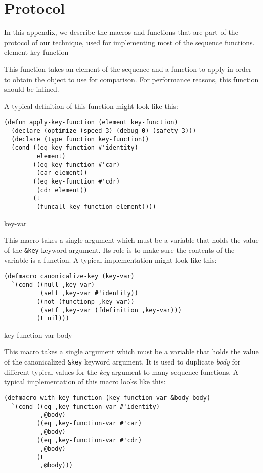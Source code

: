 \appendix

\section{Protocol}
\label{app-protocol}

In this appendix, we describe the macros and functions that are part
of the protocol of our technique, used for implementing most of the
sequence functions.
\vskip 0.3cm\noindent
{} {element key-function}

This function takes an element of the sequence and a function to apply
in order to obtain the object to use for comparison.  For performance
reasons, this function should be inlined.

A typical definition of this function might look like this:

{\small\begin{verbatim}
(defun apply-key-function (element key-function)
  (declare (optimize (speed 3) (debug 0) (safety 3)))
  (declare (type function key-function))
  (cond ((eq key-function #'identity)
         element)
        ((eq key-function #'car)
         (car element))
        ((eq key-function #'cdr)
         (cdr element))
        (t
         (funcall key-function element))))
\end{verbatim}}
\noindent
{} {key-var}

This macro takes a single argument which must be a variable that holds
the value of the \texttt{\&key} keyword argument.  Its role is to make
sure the contents of the variable is a function.  A typical
implementation might look like this:

{\small\begin{verbatim}
(defmacro canonicalize-key (key-var)
  `(cond ((null ,key-var)
          (setf ,key-var #'identity))
         ((not (functionp ,key-var))
          (setf ,key-var (fdefinition ,key-var)))
         (t nil)))
\end{verbatim}}
\noindent
{} {key-function-var \body body}

This macro takes a single argument which must be a variable that holds
the value of the canonicalized \texttt{\&key} keyword argument.  It is
used to duplicate \textit{body} for different typical values for the
\textit{key} argument to many sequence functions.  A typical
implementation of this macro looks like this:

{\small\begin{verbatim}
(defmacro with-key-function (key-function-var &body body)
  `(cond ((eq ,key-function-var #'identity)
          ,@body)
         ((eq ,key-function-var #'car)
          ,@body)
         ((eq ,key-function-var #'cdr)
          ,@body)
         (t
          ,@body)))
\end{verbatim}}

